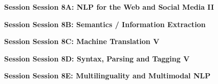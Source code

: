 \clearpage
\par\centerline{\bfseries\large Session Session 8A: NLP for the Web and Social Media II}\vspace{1em}\par
\clearpage
\par\centerline{\bfseries\large Session Session 8B: Semantics / Information Extraction}\vspace{1em}\par
\clearpage
\par\centerline{\bfseries\large Session Session 8C: Machine Translation V}\vspace{1em}\par
\clearpage
\par\centerline{\bfseries\large Session Session 8D: Syntax, Parsing and Tagging V}\vspace{1em}\par
\clearpage
\par\centerline{\bfseries\large Session Session 8E: Multilinguality and Multimodal NLP}\vspace{1em}\par
